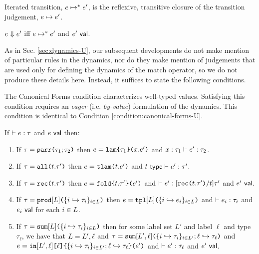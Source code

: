 {{{{\begin{definition}\label{defn:iterated-transition-UP} Iterated transition, $e \mapsto^{*} e'$, is the reflexive, transitive closure of the transition judgement, $e \mapsto e'$.\end{definition}

\begin{definition}[Evaluation]\label{defn:evaluation-UP}  $e \Downarrow e'$ iff $e \mapsto^{*} e'$ and $e'~\mathsf{val}$. \end{definition}

As in Sec. \ref{sec:dynamics-U}, our subsequent developments do not make mention of particular rules in the dynamics, nor do they make mention of judgements that are used only for defining the dynamics of the match operator, so we do not produce these details here. Instead, it suffices to state the following conditions.

The Canonical Forms condition characterizes well-typed values. Satisfying this condition requires an \emph{eager} (i.e. \emph{by-value}) formulation of the dynamics. This condition is identical to Condition \ref{condition:canonical-forms-U}.

\begin{condition}\label{condition:canonical-forms-UP} If $\vdash e : \tau$ and $e~\mathsf{val}$ then:
\begin{enumerate}
\item If $\tau=\texttt{parr}\texttt{(}\tau_1; \tau_2\texttt{)}$ then $e=\texttt{lam}\texttt{\{}\tau_1\texttt{\}(}x.e'\texttt{)}$ and $x : \tau_1 \vdash e' : \tau_2$.
\item If $\tau=\texttt{all}\texttt{(}t.\tau'\texttt{)}$ then $e=\texttt{tlam}\texttt{(}t.e'\texttt{)}$ and $t~\mathsf{type} \vdash e' : \tau'$.
\item If $\tau=\texttt{rec}\texttt{(}t.\tau'\texttt{)}$ then $e=\texttt{fold}\texttt{\{}t.\tau'\texttt{\}(}e'\texttt{)}$ and $\vdash e' : [\texttt{rec}\texttt{(}t.\tau'\texttt{)}/t]\tau'$ and $e'~\mathsf{val}$. 
\item If $\tau=\texttt{prod}[L]\texttt{(}\{i \hookrightarrow \tau_{i}\}_{i \in L}\texttt{)}$ then $e=\texttt{tpl}[L]\texttt{(}\{i \hookrightarrow e_{i}\}_{i \in L}\texttt{)}$ and $\vdash e_i : \tau_i$ and $e_i~\mathsf{val}$ for each $i \in L$.
\item If $\tau=\texttt{sum}[L]\texttt{(}\{i \hookrightarrow \tau_{i}\}_{i \in L}\texttt{)}$ then for some label set $L'$ and label $\ell$ and type $\tau_\ell$, we have that $L=L', \ell$ and $\tau=\texttt{sum}[L', \ell]\texttt{(}\{i \hookrightarrow \tau_{i}\}_{i \in L'}; \ell \hookrightarrow \tau_\ell\texttt{)}$ and $e=\texttt{in}[L', \ell]\texttt{[}\ell\texttt{]\{}\{i \hookrightarrow \tau_{i}\}_{i \in L'}; \ell \hookrightarrow \tau_\ell\texttt{\}(}e'\texttt{)}$ and $\vdash e' : \tau_\ell$ and $e'~\mathsf{val}$.
\end{enumerate}\end{condition}

}}}}
